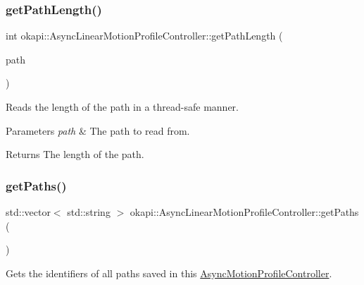 \mbox{\label{classokapi_1_1AsyncLinearMotionProfileController_aede6dc18c7d2c8f5014c4ad6cd91d85d}} 
\subsubsection{\texorpdfstring{getPathLength()}{getPathLength()}}
{\footnotesize\ttfamily int okapi\+::\+Async\+Linear\+Motion\+Profile\+Controller\+::get\+Path\+Length (\begin{DoxyParamCaption}\item[{const \mbox{\hyperlink{structokapi_1_1AsyncLinearMotionProfileController_1_1TrajectoryPair}{Trajectory\+Pair}} \&}]{path }\end{DoxyParamCaption})\hspace{0.3cm}{\ttfamily [protected]}}

Reads the length of the path in a thread-\/safe manner.


\begin{DoxyParams}{Parameters}
{\em path} & The path to read from. \\
\hline
\end{DoxyParams}
\begin{DoxyReturn}{Returns}
The length of the path. 
\end{DoxyReturn}
\mbox{\label{classokapi_1_1AsyncLinearMotionProfileController_ac8495348b177b54bc2978c8b2a27dd4e}} 
\subsubsection{\texorpdfstring{getPaths()}{getPaths()}}
{\footnotesize\ttfamily std\+::vector$<$ std\+::string $>$ okapi\+::\+Async\+Linear\+Motion\+Profile\+Controller\+::get\+Paths (\begin{DoxyParamCaption}{ }\end{DoxyParamCaption})}

Gets the identifiers of all paths saved in this {\ttfamily \mbox{\hyperlink{classokapi_1_1AsyncMotionProfileController}{Async\+Motion\+Profile\+Controller}}}.


